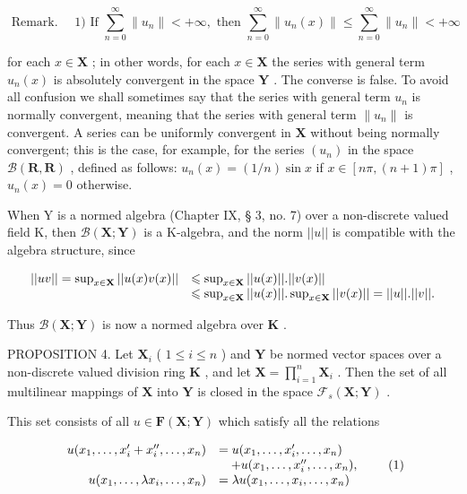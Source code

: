 \[
\text { Remark. } \quad 1) \text {   If   } \sum_ {n = 0} ^ {\infty} \| u _ {n} \| <   + \infty , \text {   then   } \sum_ {n = 0} ^ {\infty} \| u _ {n} (x) \| \leqslant \sum_ {n = 0} ^ {\infty} \| u _ {n} \| <   + \infty
\]

for each \(x \in \mathbf{X}\) ; in other words, for each \(x \in \mathbf{X}\) the series with general term \(u_n(x)\) is absolutely convergent in the space \(\mathbf{Y}\) . The converse is false. To avoid all confusion we shall sometimes say that the series with general term \(u_n\) is normally convergent, meaning that the series with general term \(\| u_n \|\) is convergent. A series can be uniformly convergent in \(\mathbf{X}\) without being normally convergent; this is the case, for example, for the series \((u_n)\) in the space \(\mathcal{B}(\mathbf{R}, \mathbf{R})\) , defined as follows: \(u_n(x) = (1/n) \sin x\) if \(x \in [n\pi, (n + 1)\pi]\) , \(u_n(x) = 0\) otherwise.

When Y is a normed algebra (Chapter IX, § 3, no. 7) over a non-discrete valued field K, then \(\mathcal{B}(\mathbf{X};\mathbf{Y})\) is a K-algebra, and the norm \(||u||\) is compatible with the algebra structure, since

\[
\begin{array}{r l} | | u v | | = \sup _ {x \in \mathbf {X}} | | u (x) v (x) | | & \leqslant \sup _ {x \in \mathbf {X}} | | u (x) | |. | | v (x) | | \\ & \leqslant \sup _ {x \in \mathbf {X}} | | u (x) | |. \sup _ {x \in \mathbf {X}} | | v (x) | | = | | u | |. | | v | |. \end{array}
\]

Thus \(\mathcal{B}(\mathbf{X};\mathbf{Y})\) is now a normed algebra over \(\mathbf{K}\) .

PROPOSITION 4. Let \(\mathbf{X}_i\) ( \(1 \leqslant i \leqslant n\) ) and \(\mathbf{Y}\) be normed vector spaces over a non-discrete valued division ring \(\mathbf{K}\) , and let \(\mathbf{X} = \prod_{i=1}^{n} \mathbf{X}_i\) . Then the set of all multilinear mappings of \(\mathbf{X}\) into \(\mathbf{Y}\) is closed in the space \(\mathcal{F}_s(\mathbf{X}; \mathbf{Y})\) .

This set consists of all \(u \in \mathbf{F}(\mathbf{X};\mathbf{Y})\) which satisfy all the relations

\[
\begin{array}{r l} u (x _ {1}, \dots , x _ {i} ^ {\prime} + x _ {i} ^ {\prime \prime}, \dots , x _ {n}) & = u (x _ {1}, \dots , x _ {i} ^ {\prime}, \dots , x _ {n}) \\ & \quad + u (x _ {1}, \dots , x _ {i} ^ {\prime \prime}, \dots , x _ {n}), \\ u (x _ {1}, \dots , \lambda x _ {i}, \dots , x _ {n}) & = \lambda u (x _ {1}, \dots , x _ {i}, \dots , x _ {n}) \end{array}\tag{1}
\]

